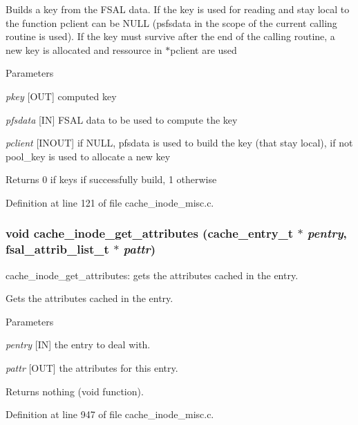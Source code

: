 Builds a key from the FSAL data. If the key is used for reading and stay local to the function pclient can be NULL (psfsdata in the scope of the current calling routine is used). If the key must survive after the end of the calling routine, a new key is allocated and ressource in $\ast$pclient are used


\begin{DoxyParams}{Parameters}
\item[{\em pkey}][OUT] computed key \item[{\em pfsdata}][IN] FSAL data to be used to compute the key \item[{\em pclient}][INOUT] if NULL, pfsdata is used to build the key (that stay local), if not pool\_\-key is used to allocate a new key \end{DoxyParams}
\begin{DoxyReturn}{Returns}
0 if keys if successfully build, 1 otherwise 
\end{DoxyReturn}


Definition at line 121 of file cache\_\-inode\_\-misc.c.
\subsubsection[{cache\_\-inode\_\-get\_\-attributes}]{\setlength{\rightskip}{0pt plus 5cm}void cache\_\-inode\_\-get\_\-attributes (cache\_\-entry\_\-t $\ast$ {\em pentry}, \/  fsal\_\-attrib\_\-list\_\-t $\ast$ {\em pattr})}\label{cache__inode__misc_8c_a8b74ff8be25748ce96f1d6258409d27d}
cache\_\-inode\_\-get\_\-attributes: gets the attributes cached in the entry.

Gets the attributes cached in the entry.


\begin{DoxyParams}{Parameters}
\item[{\em pentry}][IN] the entry to deal with. \item[{\em pattr}][OUT] the attributes for this entry.\end{DoxyParams}
\begin{DoxyReturn}{Returns}
nothing (void function). 
\end{DoxyReturn}


Definition at line 947 of file cache\_\-inode\_\-misc.c.
